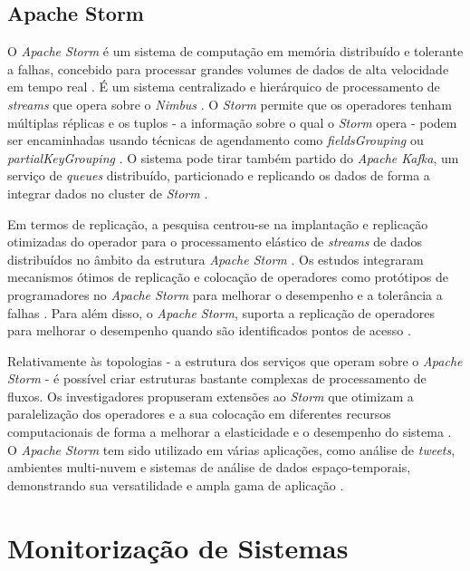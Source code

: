 \subsection{Apache Storm}

O \textit{Apache Storm} é um sistema de computação em memória distribuído e tolerante a falhas, 
concebido para processar grandes volumes de dados de alta velocidade em tempo real \cite{storm2017}. 
É um sistema centralizado e hierárquico de processamento de \textit{streams} que opera sobre o 
\textit{Nimbus} \cite{storm2015}. O \textit{Storm} permite que os operadores tenham múltiplas 
réplicas e os tuplos - a informação sobre o qual o \textit{Storm} opera - podem ser encaminhadas 
usando técnicas de agendamento como \textit{fieldsGrouping} ou \textit{partialKeyGrouping}
\cite{storm2018}. O sistema pode tirar também partido do \textit{Apache Kafka}, um serviço de 
\textit{queues} distribuído, particionado e replicando os dados de forma a integrar dados no 
\gls{cluster} de \textit{Storm} \cite{storm2018b}.


Em termos de replicação, a pesquisa centrou-se na implantação e replicação otimizadas do 
operador para o processamento elástico de \textit{streams} de dados distribuídos no âmbito 
da estrutura \textit{Apache Storm} \cite{storm2017b}. Os estudos integraram mecanismos ótimos de
replicação e colocação de operadores como protótipos de programadores no \textit{Apache Storm} para
melhorar o desempenho e a tolerância a falhas \cite{storm2017c}. Para além disso, o 
\textit{Apache Storm}, suporta a replicação de operadores para melhorar o desempenho quando são 
identificados pontos de acesso \cite{storm2018c}.

Relativamente às topologias - a estrutura dos serviços que operam sobre o \textit{Apache Storm} - 
é possível criar estruturas bastante complexas de processamento de fluxos. Os investigadores 
propuseram extensões ao \textit{Storm} que otimizam a paralelização dos operadores e a sua 
colocação em diferentes recursos computacionais de forma a melhorar a elasticidade e o desempenho 
do sistema \cite{storm2017d} . O \textit{Apache Storm} tem sido utilizado em várias 
aplicações, como análise de \textit{tweets}, ambientes multi-nuvem e sistemas de análise de dados 
espaço-temporais, demonstrando sua versatilidade e ampla gama de aplicação \cite{storm2018d} 
\cite{storm2020} \cite{storm2021}.

\section{Monitorização de Sistemas}

